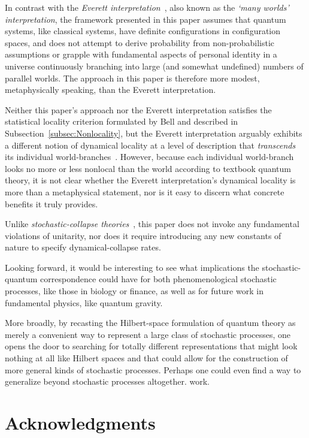 \documentclass[12pt,english,prl,superscriptaddress,nobibnotes,nofootinbib]{revtex4-2}
\begin{document}
In contrast with the \emph{Everett interpretation}~\citep{Everett:1957rsfqm,Everett:1973tuwf},
also known as the \emph{\textquoteleft many worlds\textquoteright{} interpretation},
 the framework presented in this paper assumes that quantum systems,
like classical systems, have definite configurations in configuration
spaces, and does not attempt to derive probability from non-probabilistic
assumptions or grapple with fundamental aspects of personal identity
in a universe continuously branching into large (and somewhat undefined)
numbers of parallel worlds. The approach in this paper is therefore
more modest, metaphysically speaking, than the Everett interpretation.

Neither this paper's approach nor the Everett interpretation satisfies
the statistical locality criterion formulated by Bell and described
in Subsection~\ref{subsec:Nonlocality}, but the Everett interpretation
arguably exhibits a different notion of dynamical locality at a level
of description that \emph{transcends} its individual world-branches~\citep{Wallace:2012temqtattei}.
However, because each individual world-branch looks no more or less
nonlocal than the world according to textbook quantum theory, it
is not clear whether the Everett interpretation's dynamical locality
is more than a metaphysical statement, nor is it easy to discern what
concrete benefits it truly provides.

Unlike \emph{stochastic-collapse theories}~\citep{GhirardiRiminiWeber:1986udmms,BassiGhirardi:2003drm},
this paper does not invoke any fundamental violations of unitarity,
nor does it require introducing any new constants of nature to specify
dynamical-collapse rates.

Looking forward, it would be interesting to see what implications
the stochastic-quantum correspondence could have for both phenomenological
stochastic processes, like those in biology or finance, as well as
for future work in fundamental physics, like quantum gravity.

More broadly, by recasting the Hilbert-space formulation of quantum
theory as merely a convenient way to represent a large class of stochastic
processes, one opens the door to searching for totally different representations
that might look nothing at all like Hilbert spaces and that could
allow for the construction of more general kinds of stochastic processes.
Perhaps one could even find a way to generalize beyond stochastic
processes altogether. work.

\section*{Acknowledgments}
\end{document}
